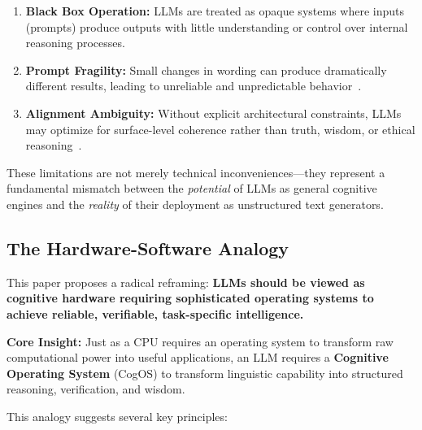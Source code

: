 \documentclass[11pt,a4paper]{article}
\theoremstyle{definition}
\theoremstyle{remark}
\begin{document}
\begin{enumerate}
    \item \textbf{Black Box Operation:} LLMs are treated as opaque systems where inputs (prompts) produce outputs with little understanding or control over internal reasoning processes.
    
    \item \textbf{Prompt Fragility:} Small changes in wording can produce dramatically different results, leading to unreliable and unpredictable behavior~\citep{vaswani2017attention}.
    
    \item \textbf{Alignment Ambiguity:} Without explicit architectural constraints, LLMs may optimize for surface-level coherence rather than truth, wisdom, or ethical reasoning~\citep{kahneman2011thinking}.
\end{enumerate}

These limitations are not merely technical inconveniences—they represent a fundamental mismatch between the \textit{potential} of LLMs as general cognitive engines and the \textit{reality} of their deployment as unstructured text generators.

\subsection{The Hardware-Software Analogy}

This paper proposes a radical reframing: \textbf{LLMs should be viewed as cognitive hardware requiring sophisticated operating systems to achieve reliable, verifiable, task-specific intelligence.}

\begin{mdframed}[style=keyprinciple]
\textbf{Core Insight:} Just as a CPU requires an operating system to transform raw computational power into useful applications, an LLM requires a \textbf{Cognitive Operating System} (CogOS) to transform linguistic capability into structured reasoning, verification, and wisdom.
\end{mdframed}

This analogy suggests several key principles:
\end{document}
